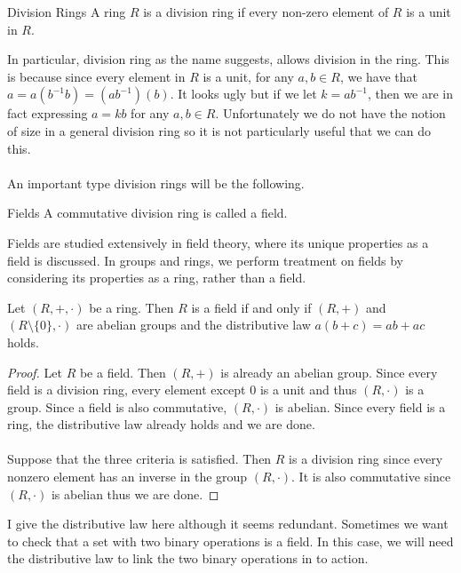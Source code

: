 \documentclass[a4paper]{article}
\begin{document}
\begin{defn}{Division Rings}{} A ring $R$ is a division ring if every non-zero element of $R$ is a unit in $R$. 
\end{defn}

In particular, division ring as the name suggests, allows division in the ring. This is because since every element in $R$ is a unit, for any $a,b\in R$, we have that $a=a(b^{-1}b)=(ab^{-1})(b)$. It looks ugly but if we let $k=ab^{-1}$, then we are in fact expressing $a=kb$ for any $a,b\in R$. Unfortunately we do not have the notion of size in a general division ring so it is not particularly useful that we can do this. \\~\\

An important type division rings will be the following. 

\begin{defn}{Fields}{} A commutative division ring is called a field. 
\end{defn}

Fields are studied extensively in field theory, where its unique properties as a field is discussed. In groups and rings, we perform treatment on fields by considering its properties as a ring, rather than a field. 

\begin{prp}{}{} Let $(R,+,\cdot)$ be a ring. Then $R$ is a field if and only if $(R,+)$ and $(R\setminus\{0\},\cdot)$ are abelian groups and the distributive law $a(b+c)=ab+ac$ holds. \tcbline
\begin{proof}
Let $R$ be a field. Then $(R,+)$ is already an abelian group. Since every field is a division ring, every element except $0$ is a unit and thus $(R,\cdot)$ is a group. Since a field is also commutative, $(R,\cdot)$ is abelian. Since every field is a ring, the distributive law already holds and we are done. \\~\\
Suppose that the three criteria is satisfied. Then $R$ is a division ring since every nonzero element has an inverse in the group $(R,\cdot)$. It is also commutative since $(R,\cdot)$ is abelian thus we are done. 
\end{proof}
\end{prp}

I give the distributive law here although it seems redundant. Sometimes we want to check that a set with two binary operations is a field. In this case, we will need the distributive law to link the two binary operations in to action. 
\end{document}
